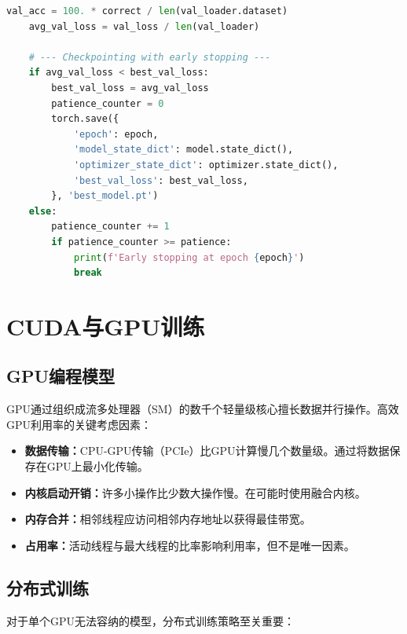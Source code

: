 \begin{code}
\begin{lstlisting}[language=python]
    val_acc = 100. * correct / len(val_loader.dataset)
    avg_val_loss = val_loss / len(val_loader)
    
    # --- Checkpointing with early stopping ---
    if avg_val_loss < best_val_loss:
        best_val_loss = avg_val_loss
        patience_counter = 0
        torch.save({
            'epoch': epoch,
            'model_state_dict': model.state_dict(),
            'optimizer_state_dict': optimizer.state_dict(),
            'best_val_loss': best_val_loss,
        }, 'best_model.pt')
    else:
        patience_counter += 1
        if patience_counter >= patience:
            print(f'Early stopping at epoch {epoch}')
            break
\end{lstlisting}
\end{code}

\section{CUDA与GPU训练}

\subsection{GPU编程模型}

GPU通过组织成流多处理器（SM）的数千个轻量级核心擅长数据并行操作。高效GPU利用率的关键考虑因素：

\begin{itemize}
    \item \textbf{数据传输：}CPU-GPU传输（PCIe）比GPU计算慢几个数量级。通过将数据保存在GPU上最小化传输。
    \item \textbf{内核启动开销：}许多小操作比少数大操作慢。在可能时使用融合内核。
    \item \textbf{内存合并：}相邻线程应访问相邻内存地址以获得最佳带宽。
    \item \textbf{占用率：}活动线程与最大线程的比率影响利用率，但不是唯一因素。
\end{itemize}

\subsection{分布式训练}

对于单个GPU无法容纳的模型，分布式训练策略至关重要：


